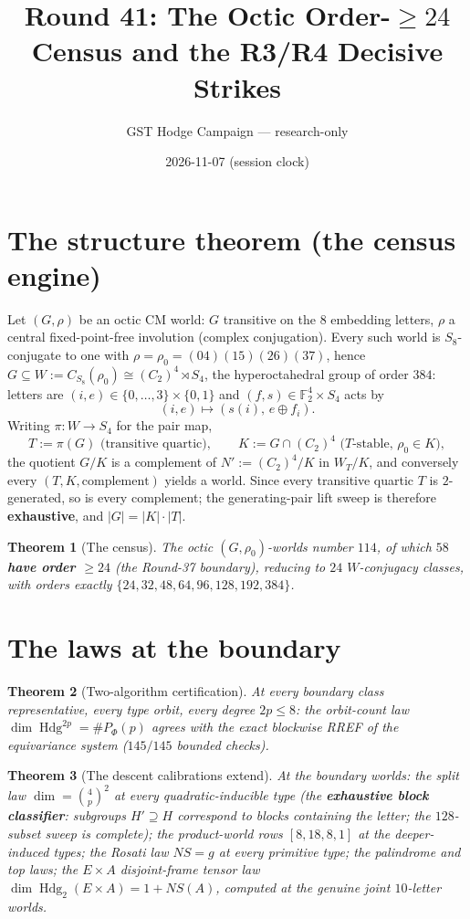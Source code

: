\documentclass[11pt]{article}
\title{Round 41: The Octic Order-$\geq 24$ Census and the R3/R4 Decisive Strikes}
\author{GST Hodge Campaign --- research-only}
\date{2026-11-07 (session clock)}
\newtheorem{theorem}{Theorem}
\begin{document}
\maketitle

\section{The structure theorem (the census engine)}

Let $(G,\rho)$ be an octic CM world: $G$ transitive on the $8$ embedding
letters, $\rho$ a central fixed-point-free involution (complex conjugation).
Every such world is $S_8$-conjugate to one with
$\rho=\rho_0=(04)(15)(26)(37)$, hence
$G \subseteq W := C_{S_8}(\rho_0) \cong (C_2)^4 \rtimes S_4$, the
hyperoctahedral group of order $384$: letters are $(i,e) \in \{0,\dots,3\}
\times \{0,1\}$ and $(f,s) \in \mathbb{F}_2^4 \times S_4$ acts by
\[
(i,e) \mapsto (s(i),\, e \oplus f_i).
\]
Writing $\pi : W \to S_4$ for the pair map,
\[
T := \pi(G) \text{ (transitive quartic)}, \qquad
K := G \cap (C_2)^4 \text{ ($T$-stable, } \rho_0 \in K),
\]
the quotient $G/K$ is a complement of $N' := (C_2)^4/K$ in $W_T/K$, and
conversely every $(T,K,\text{complement})$ yields a world. Since every
transitive quartic $T$ is $2$-generated, so is every complement; the
generating-pair lift sweep is therefore \textbf{exhaustive}, and
$|G| = |K| \cdot |T|$.

\begin{theorem}[The census]
The octic $(G,\rho_0)$-worlds number $114$, of which \textbf{$58$ have order
$\geq 24$} (the Round-37 boundary), reducing to $24$ $W$-conjugacy classes,
with orders exactly $\{24, 32, 48, 64, 96, 128, 192, 384\}$.
\end{theorem}

\section{The laws at the boundary}

\begin{theorem}[Two-algorithm certification]
At every boundary class representative, every type orbit, every degree
$2p \leq 8$: the orbit-count law $\dim \operatorname{Hdg}^{2p} = \#P_\Phi(p)$
agrees with the exact blockwise RREF of the equivariance system
($145/145$ bounded checks).
\end{theorem}

\begin{theorem}[The descent calibrations extend]
At the boundary worlds: the split law
$\dim = \binom{4}{p}^2$ at every quadratic-inducible type (the
\textbf{exhaustive block classifier}: subgroups $H' \supseteq H$ correspond
to blocks containing the letter; the $128$-subset sweep is complete); the
product-world rows $[8,18,8,1]$ at the deeper-induced types; the Rosati law
$NS = g$ at every primitive type; the palindrome and top laws; the
$E \times A$ disjoint-frame tensor law $\dim \operatorname{Hdg}_2(E \times A)
= 1 + NS(A)$, computed at the genuine joint $10$-letter worlds.
\end{theorem}
\end{document}
